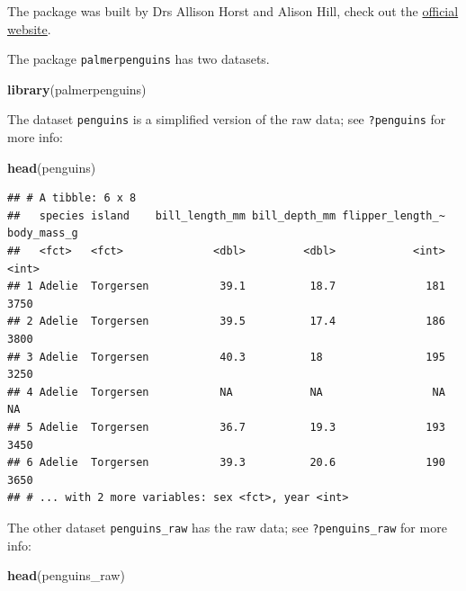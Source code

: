 \documentclass[
  12pt,
]{book}
\newenvironment{Shaded}{\begin{snugshade}}{\end{snugshade}}
\newcommand{\KeywordTok}[1]{\textcolor[rgb]{0.13,0.29,0.53}{\textbf{#1}}}
\newcommand{\NormalTok}[1]{#1}
\begin{document}
The package was built by Drs Allison Horst and Alison Hill, check out the \href{https://allisonhorst.github.io/palmerpenguins/}{official website}.

The package \texttt{palmerpenguins} has two datasets.

\begin{Shaded}
\begin{Highlighting}[]
\KeywordTok{library}\NormalTok{(palmerpenguins)}
\end{Highlighting}
\end{Shaded}

The dataset \texttt{penguins} is a simplified version of the raw data; see \texttt{?penguins} for more info:

\begin{Shaded}
\begin{Highlighting}[]
\KeywordTok{head}\NormalTok{(penguins)}
\end{Highlighting}
\end{Shaded}

\begin{verbatim}
## # A tibble: 6 x 8
##   species island    bill_length_mm bill_depth_mm flipper_length_~ body_mass_g
##   <fct>   <fct>              <dbl>         <dbl>            <int>       <int>
## 1 Adelie  Torgersen           39.1          18.7              181        3750
## 2 Adelie  Torgersen           39.5          17.4              186        3800
## 3 Adelie  Torgersen           40.3          18                195        3250
## 4 Adelie  Torgersen           NA            NA                 NA          NA
## 5 Adelie  Torgersen           36.7          19.3              193        3450
## 6 Adelie  Torgersen           39.3          20.6              190        3650
## # ... with 2 more variables: sex <fct>, year <int>
\end{verbatim}

The other dataset \texttt{penguins\_raw} has the raw data; see \texttt{?penguins\_raw} for more info:

\begin{Shaded}
\begin{Highlighting}[]
\KeywordTok{head}\NormalTok{(penguins\_raw)}
\end{Highlighting}
\end{Shaded}
\end{document}
